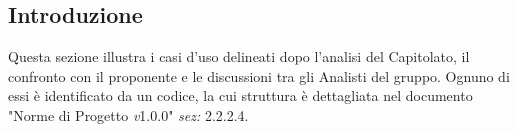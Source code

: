 \subsection{Introduzione}
Questa sezione illustra i casi d'uso delineati dopo l'analisi del Capitolato, il confronto con il proponente e le discussioni tra gli Analisti del gruppo. Ognuno di essi è identificato da un codice, la cui struttura è dettagliata nel documento "Norme di Progetto \textit{v}1.0.0" \textit{sez:} 2.2.2.4.